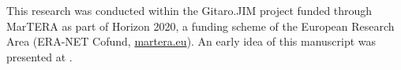 \documentclass[onecolumn,extra,referee,camera]{gji}
\begin{document}
\begin{acknowledgments} %
This research was conducted within the Gitaro.JIM project funded through
MarTERA as part of Horizon 2020, a funding scheme of the European Research Area
(ERA-NET Cofund, \href{https://www.martera.eu}{martera.eu}).
An early idea of this manuscript was presented at \cite{EAGE.20.Werthmuller}.
\end{acknowledgments}





\label{lastpage}
\end{document}
